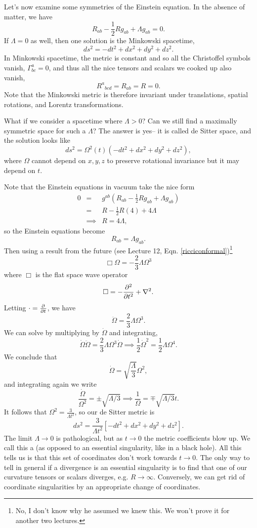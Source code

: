 Let's now examine some symmetries of the Einstein equation. In the absence of matter, we have
$$R_{ab}-\frac{1}{2} R g_{ab} +\Lambda g_{ab}=0.$$
If $\Lambda=0$ as well, then one solution is the Minkowski spacetime,
$$ds^2 = -dt^2 + dx^2 +dy^2 +dz^2.$$
In Minkowski spacetime, the metric is constant and so all the Christoffel symbols vanish, $\Gamma^a_{bc}=0$, and thus all the nice tensors and scalars we cooked up also vanish,
$${R^a}_{bcd}=R_{ab}=R=0.$$ Note that the Minkowski metric is therefore invariant under translations, spatial rotations, and Lorentz transformations.

What if we consider a spacetime where $\Lambda >0$? Can we still find a maximally symmetric space for such a $\Lambda$? The answer is yes-- it is called de Sitter space, and the solution looks like
$$ds^2=\Omega^2(t) (-dt^2+dx^2+dy^2+dz^2),$$
where $\Omega$ cannot depend on $x,y,z$ to preserve rotational invariance but it may depend on $t$.

Note that the Einstein equations in vacuum take the nice form
\begin{eqnarray*}
0&=& g^{ab}(R_{ab}-\frac{1}{2} R g_{ab}+\Lambda g_{ab})\\
&=&R -\frac{1}{2} R (4) +4 \Lambda\\
&\implies& R=4\Lambda,
\end{eqnarray*}
so the Einstein equations become
$$R_{ab}=\Lambda g_{ab}.$$
Then using a result from the future (see Lecture 12, Eqn. \ref{ricciconformal})\footnote{No, I don't know why he assumed we knew this. We won't prove it for another two lectures.}
$$\Box \Omega = -\frac{2}{3} \Lambda \Omega^3$$
where $\Box$ is the flat space wave operator
$$\Box = -\frac{\p^2}{\p t^2}+\nabla^2.$$
Letting $\cdot =\P{}{t}$, we have
$$\ddot \Omega = \frac{2}{3} \Lambda \Omega^3.$$
We can solve by multiplying by $\dot \Omega$ and integrating,
$$\dot \Omega \ddot \Omega = \frac{2}{3} \Lambda \Omega^3 \dot \Omega \implies \frac{1}{2} \dot \Omega^2 = \frac{1}{2} \Lambda \Omega^4.$$
We conclude that
$$\dot \Omega = \sqrt{\frac{\Lambda}{3}} \Omega^2,$$
and integrating again we write
$$\frac{\dot \Omega}{\Omega^2}=\pm\sqrt{\Lambda/3} \implies \frac{1}{\Omega}=\mp \sqrt{\Lambda/3}t.$$
It follows that $\Omega^2=\frac{3}{\Lambda t^2}$, so our de Sitter metric is
$$ds^2 = \frac{3}{\Lambda t^2}[-dt^2+dx^2 +dy^2 +dz^2].$$
The limit $\Lambda \to 0$ is pathological, but as $t\to 0$ the metric coefficients blow up. We call this a  (as opposed to an essential singularity, like in a black hole). All this tells us is that this set of coordinates don't work towards $t\to 0$. The only way to tell in general if a divergence is an essential singularity is to find that one of our curvature tensors or scalars diverges, e.g. $R\to \infty.$ Conversely, we can get rid of coordinate singularities by an appropriate change of coordinates.

